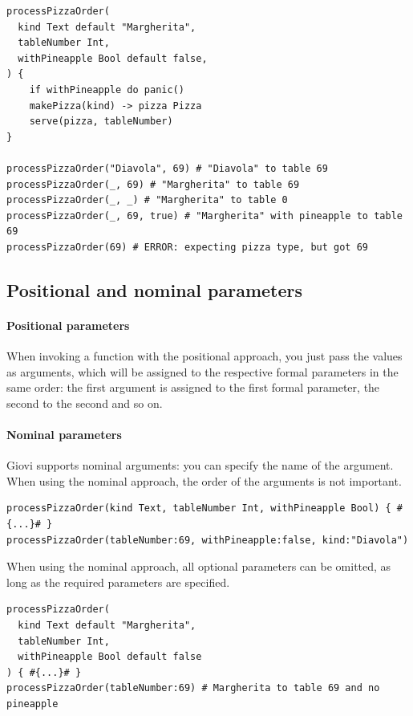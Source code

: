 \begin{verbatim}
processPizzaOrder(
  kind Text default "Margherita",
  tableNumber Int,
  withPineapple Bool default false,
) {
	if withPineapple do panic()
	makePizza(kind) -> pizza Pizza
	serve(pizza, tableNumber)
}

processPizzaOrder("Diavola", 69) # "Diavola" to table 69
processPizzaOrder(_, 69) # "Margherita" to table 69
processPizzaOrder(_, _) # "Margherita" to table 0
processPizzaOrder(_, 69, true) # "Margherita" with pineapple to table 69
processPizzaOrder(69) # ERROR: expecting pizza type, but got 69
\end{verbatim}

\subsection{Positional and nominal parameters}
\label{sec:arg_approach}

\paragraph{Positional parameters} When invoking a function with the positional
approach, you just pass the values as arguments, which will be assigned to the
respective formal parameters in the same order: the first argument is assigned
to the first formal parameter, the second to the second and so on.

\paragraph{Nominal parameters} \label{sec:nominal_params} Giovi supports
nominal arguments: you can specify the name of the argument. When using the
nominal approach, the order of the arguments is not important.

\begin{verbatim}
processPizzaOrder(kind Text, tableNumber Int, withPineapple Bool) { #{...}# }
processPizzaOrder(tableNumber:69, withPineapple:false, kind:"Diavola")
\end{verbatim}

When using the nominal approach, all optional parameters can be omitted, as
long as the required parameters are specified.

\begin{verbatim}
processPizzaOrder(
  kind Text default "Margherita",
  tableNumber Int,
  withPineapple Bool default false
) { #{...}# }
processPizzaOrder(tableNumber:69) # Margherita to table 69 and no pineapple
\end{verbatim}

